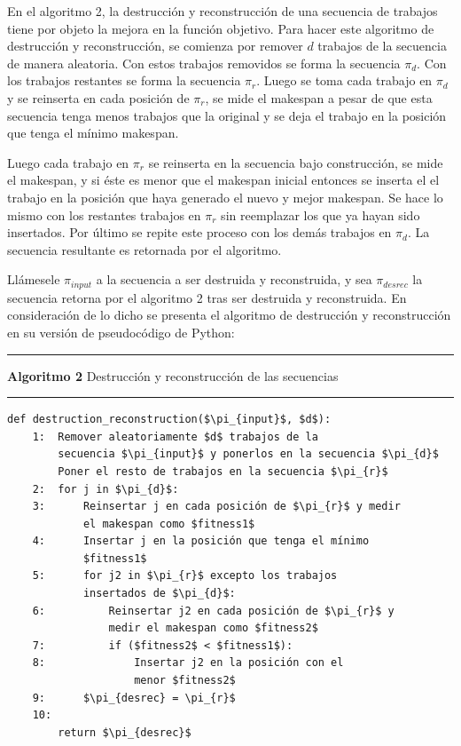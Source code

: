 \documentclass{article}
\begin{document}
\vspace{\baselineskip}
En el algoritmo 2, la destrucción y reconstrucción de una secuencia de trabajos tiene por objeto la mejora en la función objetivo. Para hacer este algoritmo de destrucción y reconstrucción, se comienza por remover $d$ trabajos de la secuencia de manera aleatoria. Con estos trabajos removidos se forma la secuencia $\pi_{d}$. Con los trabajos restantes se forma la secuencia $\pi_{r}$. Luego se toma cada trabajo en $\pi_{d}$ y se reinserta en cada posición de $\pi_{r}$, se mide el makespan a pesar de que esta secuencia tenga menos trabajos que la original y se deja el trabajo en la posición que tenga el mínimo makespan. \autocite{algMNIG}

\vspace{\baselineskip}
Luego cada trabajo en $\pi_{r}$ se reinserta en la secuencia bajo construcción, se mide el makespan, y si éste es menor que el makespan inicial entonces se inserta el el trabajo en la posición que haya generado el nuevo y mejor makespan. Se hace lo mismo con los restantes trabajos en $\pi_{r}$ sin reemplazar los que ya hayan sido insertados. Por último se repite este proceso con los demás trabajos en $\pi_{d}$. La secuencia resultante es retornada por el algoritmo. \autocite{algMNIG}

\vspace{\baselineskip}
Llámesele $\pi_{input}$ a la secuencia a ser destruida y reconstruida, y sea $\pi_{desrec}$ la secuencia retorna por el algoritmo 2 tras ser destruida y reconstruida. En consideración de lo dicho se presenta el algoritmo de destrucción y reconstrucción en su versión de pseudocódigo de Python:

\noindent\noindent
\rule{\linewidth}{0.4pt}

\textbf{Algoritmo 2} Destrucción y reconstrucción de las secuencias

\noindent\noindent
\rule{\linewidth}{0.4pt}

\begin{lstlisting}[mathescape=true]
    def destruction_reconstruction($\pi_{input}$, $d$):
    1:  Remover aleatoriamente $d$ trabajos de la
        secuencia $\pi_{input}$ y ponerlos en la secuencia $\pi_{d}$
        Poner el resto de trabajos en la secuencia $\pi_{r}$
    2:  for j in $\pi_{d}$:
    3:      Reinsertar j en cada posición de $\pi_{r}$ y medir
            el makespan como $fitness1$
    4:      Insertar j en la posición que tenga el mínimo 
            $fitness1$
    5:      for j2 in $\pi_{r}$ excepto los trabajos
            insertados de $\pi_{d}$:
    6:          Reinsertar j2 en cada posición de $\pi_{r}$ y 
                medir el makespan como $fitness2$
    7:          if ($fitness2$ < $fitness1$):
    8:              Insertar j2 en la posición con el 
                    menor $fitness2$
    9:      $\pi_{desrec} = \pi_{r}$
    10:
        return $\pi_{desrec}$
\end{lstlisting}
\end{document}
